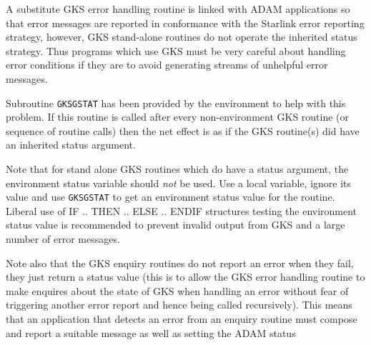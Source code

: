 \documentclass[twoside,11pt]{article}
\newcommand{\htmlref}[2]{#1}
\renewcommand{\_}{\texttt{\symbol{95}}}
\begin{document}
A substitute GKS error handling routine is linked with ADAM applications so
that error messages are reported in conformance with the Starlink error
reporting strategy, however, GKS stand-alone routines do not operate the
inherited status strategy. Thus programs which use GKS must be very careful
about handling error conditions if they are to avoid generating streams
of unhelpful error messages.

Subroutine \htmlref{{\tt GKS\_GSTAT}}{GKS_GSTAT}
 has been provided by the environment to help with this problem.
If this routine is called after every non-environment GKS routine
(or sequence of routine calls) then the
net effect is as if the GKS routine(s) did have an inherited status argument.

Note that for stand alone GKS routines which do have a status argument, the
environment status variable should {\em not} be used. Use a local variable,
ignore its value and use {\tt GKS\_GSTAT} to get an environment status value
for the
routine. Liberal use of IF .. THEN .. ELSE .. ENDIF structures testing the
environment status value is recommended to prevent invalid output from GKS and
a large number of error messages.

Note also that the GKS enquiry routines do not report an error when they fail,
they just return a status value (this is to allow the GKS error handling
routine to make enquires about the state of GKS when handling an error without
fear of triggering another error report and hence being called recursively).
This means that an application that detects an error from an enquiry routine
must compose and report a suitable message as well as setting the ADAM status
\end{document}
